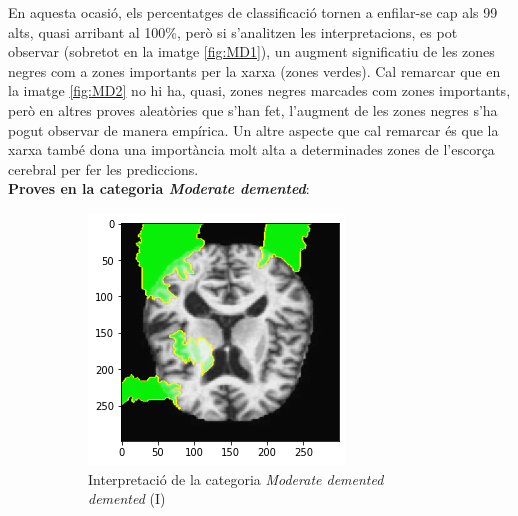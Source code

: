 \documentclass[a4paper,12pt]{article}
\begin{document}
En aquesta ocasió, els percentatges de classificació tornen a enfilar-se cap als 99 alts, quasi arribant al 100\%, però si s'analitzen les interpretacions, es pot observar (sobretot en la imatge \ref{fig:MD1}), un augment significatiu de les zones negres com a zones importants per la xarxa (zones verdes). Cal remarcar que en la imatge \ref{fig:MD2} no hi ha, quasi, zones negres marcades com zones importants, però en altres proves aleatòries que s'han fet, l'augment de les zones negres s'ha pogut observar de manera empírica. Un altre aspecte que cal remarcar és que la xarxa també dona una importància molt alta a determinades zones de l'escorça cerebral per fer les prediccions.\\
\textbf{Proves en la categoria \textit{Moderate demented}}:
\begin{figure}[h!]
    \centering
    \begin{subfigure}[b]{0.40\linewidth}
        \includegraphics[width=\linewidth]{images/Moderately demented.png}
        \caption{Interpretació de la categoria \textit{Moderate demented demented} (I)}
        \label{fig:ModD1}
    \end{subfigure}
    \begin{subfigure}[b]{0.40\linewidth}

\end{subfigure}
\end{figure}
\end{document}
